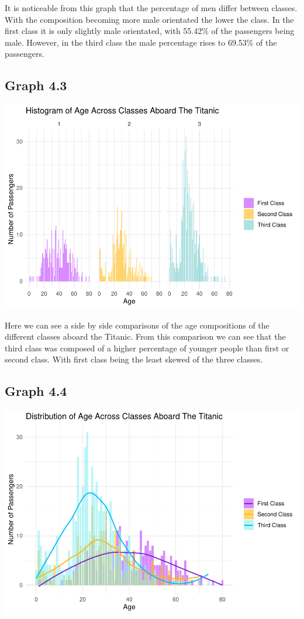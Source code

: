 \documentclass[
  11pt,
]{article}
\begin{document}
It is noticeable from this graph that the percentage of men differ
between classes. With the composition becoming more male orientated the
lower the class. In the first class it is only slightly male orientated,
with 55.42\% of the passengers being male. However, in the third class
the male percentage rises to 69.53\% of the passengers.

\hypertarget{graph-4.3}{%
\subsection{Graph 4.3}\label{graph-4.3}}

\includegraphics{README_files/figure-latex/unnamed-chunk-4-1.pdf}

Here we can see a side by side comparisons of the age compositions of
the different classes aboard the Titanic. From this comparison we can
see that the third class was composed of a higher percentage of younger
people than first or second class. With first class being the least
skewed of the three classes.

\hypertarget{graph-4.4}{%
\subsection{Graph 4.4}\label{graph-4.4}}

\includegraphics{README_files/figure-latex/unnamed-chunk-5-1.pdf}
\end{document}

